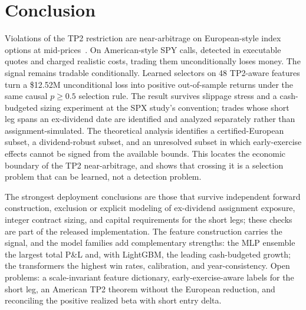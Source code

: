 \documentclass[sigconf,review]{acmart}
\begin{document}
\section{Conclusion}
Violations of the TP2 restriction are near-arbitrage on European-style index options at mid-prices~\cite{glasserman2025tp2,glasserman2026tp2theory}. On American-style SPY calls, detected in executable quotes and charged realistic costs, trading them unconditionally loses money. The signal remains tradable conditionally. Learned selectors on 48 TP2-aware features turn a \$12.52M unconditional loss into positive out-of-sample returns under the same causal $p\ge0.5$ selection rule. The result survives slippage stress and a cash-budgeted sizing experiment at the SPX study's convention; trades whose short leg spans an ex-dividend date are identified and analyzed separately rather than assignment-simulated. The theoretical analysis identifies a certified-European subset, a dividend-robust subset, and an unresolved subset in which early-exercise effects cannot be signed from the available bounds. This locates the economic boundary of the TP2 near-arbitrage, and shows that crossing it is a selection problem that can be learned, not a detection problem.

The strongest deployment conclusions are those that survive independent forward construction, exclusion or explicit modeling of ex-dividend assignment exposure, integer contract sizing, and capital requirements for the short legs; these checks are part of the released implementation. The feature construction carries the signal, and the model families add complementary strengths: the MLP ensemble the largest total P\&L and, with LightGBM, the leading cash-budgeted growth; the transformers the highest win rates, calibration, and year-consistency. Open problems: a scale-invariant feature dictionary, early-exercise-aware labels for the short leg, an American TP2 theorem without the European reduction, and reconciling the positive realized beta with short entry delta.
\end{document}
